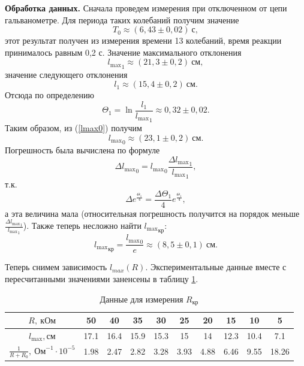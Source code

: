 \documentclass[12pt,a4paper]{article}
\begin{document}
\textbf{Обработка данных.} Сначала проведем измерения при отключенном от цепи гальванометре. Для периода таких колебаний получим значение
\begin{equation}
T_0 \approx (6,43 \pm 0,02)~\text{с},
\end{equation}
этот результат получен из измерения времени 13 колебаний, время реакции принималось равным 0,2 с. Значение максимального отклонения 
\begin{equation}
{l_\text{max}}_1 \approx (21,3\pm0,2)~\text{см},
\end{equation}
значение следующего отклонения
\begin{equation} 
l_1 \approx (15,4\pm0,2)~\text{см}.
\end{equation}
Отсюда по определению
\begin{equation}
\Theta_1 = \ln\frac{l_1}{{l_\text{max}}_1} \approx 0,32\pm0,02.
\end{equation}
Таким образом, из (\ref{lmax0}) получим
\begin{equation}
{l_\text{max}}_0 \approx (23,1\pm0,2)~\text{см}.\label{lmax0val}
\end{equation}
Погрешность была вычислена по формуле
\begin{equation}
\Delta {l_\text{max}}_0 = {l_\text{max}}_0\frac{\Delta {l_\text{max}}_1}{{l_\text{max}}_1},
\end{equation}
т.к.
\begin{equation}
\Delta e^{\frac{\Theta_1}{4}} = \frac{\Delta\Theta_1}{4}e^{\frac{\Theta_1}{4}},
\end{equation}
а эта величина мала (относительная погрешность получится на порядок меньше $\frac{\Delta {l_\text{max}}_1}{{l_\text{max}}_1}$). Также теперь несложно найти ${l_\text{max}}_\text{кр}$:
\begin{equation}
{l_\text{max}}_\text{кр} = \frac{{l_\text{max}}_0}{e} \approx (8,5\pm0,1)~\text{см}. 
\end{equation}

Теперь снимем зависимость $l_{max}(R)$. Экспериментальные данные вместе с пересчитанными значениями заненсены в таблицу \ref{tab3}.
\begin{table}[ht]\centering
\begin{tabular}{|*{10}{c|}}
\hline
$R,~\text{кОм}$&50&40&35&30&25&20&15&10&5\\
\hline
$l_\text{max},\text{см}$&17.1&16.4&15.9&15.3&15&14&12.3&10.4&7.1\\
\hline
$\frac{1}{R + R_0},~\text{Ом}^{-1}\cdot10^{-5}$&1.98&2.47&2.82&3.28&3.93&4.88&6.46&9.55&18.26\\
\hline
\end{tabular}
\caption{Данные для измерения $R_\text{кр}$ \label{tab3}}
\end{table}
\end{document}
